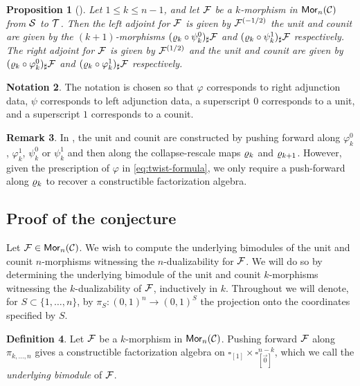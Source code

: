 \documentclass[10pt, reqno, twoside
, final
]{amsart}
\numberwithin{equation}{subsection}%
\theoremstyle{definition}
\newtheorem{defn}{Definition}[subsection]
\theoremstyle{definition}
\theoremstyle{definition}
\newtheorem{nota}[defn]{Notation}
\theoremstyle{definition}
\theoremstyle{definition}
\theoremstyle{definition}
\theoremstyle{definition}
\theoremstyle{definition}
\theoremstyle{definition}
\theoremstyle{plain}
\theoremstyle{definition}
\theoremstyle{plain}
\theoremstyle{definition}
\theoremstyle{plain}
\theoremstyle{definition}
\newtheorem{rmk}[defn]{Remark}
\theoremstyle{definition}
\theoremstyle{plain}
\theoremstyle{plain}
\theoremstyle{definition}
\theoremstyle{plain}
\theoremstyle{plain}
\newtheorem{prop}[defn]{Proposition}
\theoremstyle{plain}
\begin{document}
\begin{prop}[\cite{GS}]\label{prop:En-adjoint-data}
Let $1\leq k \leq n-1$, and let ${\mathcal{F}}$ be a $k$-morphism in $\mathsf{Mor}_n(\mathcal{C})$ from $\mathcal{S}$ to $\mathcal{T}$. Then the left adjoint for $\mathcal{F}$ is given by $\mathcal{F}^{(-1/2)}$ the unit and counit are given by the $(k+1)$-morphisms $(\varrho_{k} \circ \psi^0_k)_{\sharp} \mathcal{F}$ and $(\varrho_{k} \circ \psi^1_k)_{\sharp} \mathcal{F}$ respectively. The right adjoint for $\mathcal{F}$ is given by $\mathcal{F}^{(1/2)}$ and the unit and counit are given by $(\varrho_{k} \circ \varphi^0_k)_{\sharp} \mathcal{F}$ and $(\varrho_{k} \circ \varphi^1_k)_{\sharp} \mathcal{F}$ respectively.
\end{prop}



\begin{nota}
The notation is chosen so that $\varphi$ corresponds to right adjunction data, $\psi$ corresponds to left adjunction data, a superscript $0$ corresponds to a unit, and a superscript $1$ corresponds to a counit.
\end{nota}

\begin{rmk}
In \cite{GS}, the unit and counit are constructed by pushing forward along $\varphi_k^0$, $\varphi_k^1$, $\psi_k^0$ or $\psi_k^1$ and then along the collapse-rescale maps $\varrho_{k}$ and $\varrho_{k+1}$. However, given the prescription of $\varphi$ in \eqref{eq:twist-formula}, we only require a push-forward along $\varrho_{k}$ to recover a constructible factorization algebra.
\end{rmk}

\subsection{Proof of the conjecture}\label{sec:geometric_part}

Let $\mathcal{F} \in \mathsf{Mor}_{n}(\mathcal{C})$. We wish to compute the underlying bimodules of the unit and counit $n$-morphisms witnessing the $n$-dualizability for $\mathcal{F}$. We will do so by determining the underlying bimodule of the unit and counit $k$-morphisms witnessing the $k$-dualizability of $\mathcal{F}$, inductively in $k$.
Throughout we will denote, for $S\subset\{1,\ldots, n\}$, by $\pi_S:(0,1)^n \to (0,1)^S$ the projection onto the  coordinates specified by $S$.

\begin{defn}
Let $\mathcal{F}$ be a $k$-morphism in $\mathsf{Mor}_{n}(\mathcal{C})$. Pushing forward $\mathcal{F}$ along $\pi_{k,...,n}$ gives a constructible factorization algebra on $\square_{[1]} \times \square_{[\vec{0}]}^{n-k}$, which we call the \emph{underlying bimodule} of $\mathcal{F}$.
\end{defn}
\end{document}
